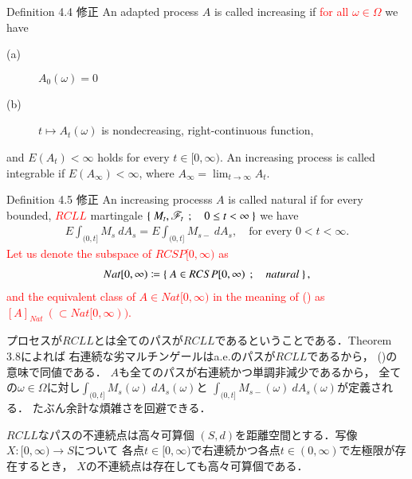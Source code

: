 	\begin{itembox}[l]{Definition 4.4 修正}
		An adapted process $A$ is called increasing if \textcolor{red}{for all $\omega \in \Omega$} we have
		\begin{description}
			\item[(a)] $A_0(\omega) = 0$
			\item[(b)] $t \longmapsto A_t(\omega)$ is nondecreasing, right-continuous function,
		\end{description}
		and $E(A_t) < \infty$ holds for every $t \in [0,\infty)$.
		An increasing process is called integrable if $E(A_\infty) < \infty$,
		where $A_\infty = \lim_{t \to \infty} A_t$.
	\end{itembox}
	
	\begin{itembox}[l]{Definition 4.5 修正}
		An increasing processs $A$ is called natural if for every bounded, 
		\textcolor{red}{$RCLL$} martingale $\left\{\ M_t,\mathscr{F}_t\ \, ; \quad 0 \leq t < \infty\ \right\}$ we have
		\begin{align}
			E \int_{(0,t]} M_s\ dA_s = E \int_{(0,t]} M_{s-}\ dA_s,
			\quad \mbox{for every $0 < t < \infty$}.
		\end{align}
		\textcolor{red}{Let us denote the subspace of $RCSP[0,\infty)$ as
		\begin{align}
			Nat[0,\infty) \coloneqq
			\left\{\ A \in RCSP[0,\infty)\ \, ; \quad natural\ \right\},
		\end{align}
		and the equivalent class of $A \in Nat[0,\infty)$
		in the meaning of () as $[A]_{Nat}\ ( \subset Nat[0,\infty))$.}
	\end{itembox}
	
	プロセスが$RCLL$とは全てのパスが$RCLL$であるということである．Theorem 3.8によれば
	右連続な劣マルチンゲールはa.e.のパスが$RCLL$であるから，
	()の意味で同値である．
	$A$も全てのパスが右連続かつ単調非減少であるから，
	全ての$\omega \in \Omega$に対し$\int_{(0,t]} M_s(\omega)\ dA_s(\omega)$と
	$\int_{(0,t]} M_{s-}(\omega)\ dA_s(\omega)$が定義される．
	たぶん余計な煩雑さを回避できる．
		
	\begin{itembox}[l]{$RCLL$なパスの不連続点は高々可算個}
		$(S,d)$を距離空間とする．写像$X:[0,\infty) \longrightarrow S$について
		各点$t \in [0,\infty)$で右連続かつ各点$t \in (0,\infty)$で左極限が存在するとき，
		$X$の不連続点は存在しても高々可算個である．
	\end{itembox}
	
